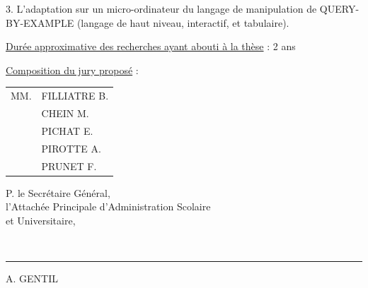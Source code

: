 3. L'adaptation sur un micro-ordinateur du langage de manipulation de QUERY-BY-EXAMPLE (langage de haut niveau, interactif, et tabulaire).

\uline{Durée approximative des recherches ayant abouti à la thèse} : 2 ans

\uline{Composition du jury proposé} :

\begin{tabular}{ll}
MM. & FILLIATRE B.\\
& CHEIN M.\\
& PICHAT E.\\
& PIROTTE A.\\
& PRUNET F.
\end{tabular}

\begin{center}
P. le Secrétaire Général,\\
l'Attachée Principale d'Administration Scolaire\\
et Universitaire,

\\[-1ex]
\hspace*{2em}\rule{3em}{0.3pt}

A. GENTIL
\end{center}

